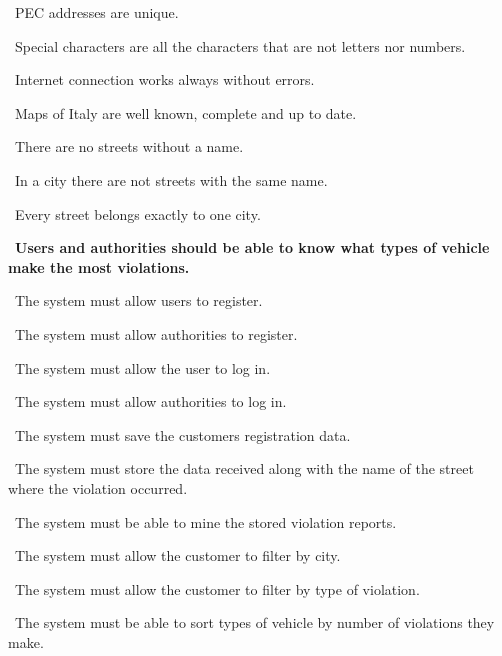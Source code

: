 \begin{description}
\begin{description}
\begin{description}
							\item {}\ PEC addresses are unique.
							\item {}\ Special characters are all the characters that are not letters nor numbers.
							\item {}\ Internet connection works always without errors.
							\item {}\ Maps of Italy are well known, complete and up to date.
							\item {}\ There are no streets without a name.
							\item {}\ In a city there are not streets with the same name.
							\item {}\ Every street belongs exactly to one city.
						\end{description}
					\item {}\ \textbf{Users and authorities should be able to know what types of vehicle make the most violations.}
						\begin{description}
							\item {}\ The system must allow users to register.
							\item {}\ The system must allow authorities to register.
							\item {}\ The system must allow the user to log in.
							\item {}\ The system must allow authorities to log in.
							\item {}\ The system must save the customers registration data.
							\item {}\ The system must store the data received along with the name of the street where the violation occurred.
							\item {}\ The system must be able to mine the stored violation reports.
							\item {}\ The system must allow the customer to filter by city.
							\item {}\ The system must allow the customer to filter by type of violation.
							\item {}\ The system must be able to sort types of vehicle by number of violations they make.

\end{description}
\end{description}
\end{description}
